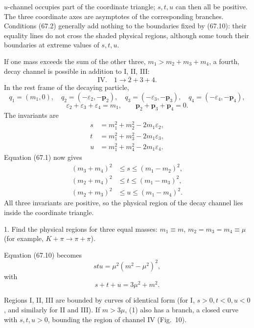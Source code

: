 $u$-channel occupies part of the coordinate triangle; $s,t,u$ can then all be positive. The three coordinate axes are asymptotes of the corresponding branches. Conditions (67.2) generally add nothing to the boundaries fixed by (67.10): their equality lines do not cross the shaded physical regions, although some touch their boundaries at extreme values of $s,t,u$.

If one mass exceeds the sum of the other three, $m_1>m_2+m_3+m_4$, a fourth, decay channel is possible in addition to I, II, III:
\begin{equation}
\mathrm{IV}.\quad1\to\overline2+3+4.
\tag{67.11}
\end{equation}
In the rest frame of the decaying particle,
\[
q_1=(m_1,0),\quad q_2=(-\varepsilon_2,-\mathbf p_2),\quad q_3=(-\varepsilon_3,-\mathbf p_3),\quad q_4=(-\varepsilon_4,-\mathbf p_4),
\]
\[
\varepsilon_2+\varepsilon_3+\varepsilon_4=m_1,\qquad \mathbf p_2+\mathbf p_3+\mathbf p_4=0.
\]
The invariants are
\begin{equation}
\begin{aligned}
s&=m_1^2+m_2^2-2m_1\varepsilon_2,\\
t&=m_1^2+m_3^2-2m_1\varepsilon_3,\\
u&=m_1^2+m_4^2-2m_1\varepsilon_4.
\end{aligned}
\tag{67.12}
\end{equation}
Equation (67.1) now gives
\begin{equation}
\begin{aligned}
(m_3+m_4)^2&\leqslant s\leqslant(m_1-m_2)^2,\\
(m_2+m_4)^2&\leqslant t\leqslant(m_1-m_3)^2,\\
(m_2+m_3)^2&\leqslant u\leqslant(m_1-m_4)^2.
\end{aligned}
\tag{67.13}
\end{equation}
All three invariants are positive, so the physical region of the decay channel lies inside the coordinate triangle.

\ProblemHeading

1. Find the physical regions for three equal masses: $m_1\equiv m$, $m_2=m_3=m_4\equiv\mu$ (for example, $K+\pi\to\pi+\pi$).

\SolutionHeading Equation (67.10) becomes
\begin{equation}
stu=\mu^2(m^2-\mu^2)^2,
\tag{1}
\end{equation}
with
\[
s+t+u=3\mu^2+m^2.
\]

Regions I, II, III are bounded by curves of identical form (for I, $s>0,t<0,u<0$, and similarly for II and III). If $m>3\mu$, (1) also has a branch, a closed curve with $s,t,u>0$, bounding the region of channel IV (Fig.~10).

